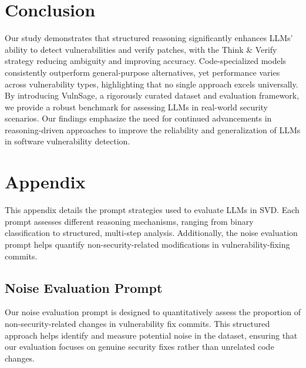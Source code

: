 \documentclass[sigconf]{acmart}
\begin{document}
\section{Conclusion}
\label{section:conclusion}
Our study demonstrates that structured reasoning significantly enhances LLMs' ability to detect vulnerabilities and verify patches, with the Think \& Verify strategy reducing ambiguity and improving accuracy. Code-specialized models consistently outperform general-purpose alternatives, yet performance varies across vulnerability types, highlighting that no single approach excels universally. By introducing VulnSage, a rigorously curated dataset and evaluation framework, we provide a robust benchmark for assessing LLMs in real-world security scenarios. Our findings emphasize the need for continued advancements in reasoning-driven approaches to improve the reliability and generalization of LLMs in software vulnerability detection.







\clearpage
\twocolumn
\flushbottom
\section{Appendix}
\label{appendix}

This appendix details the prompt strategies used to evaluate LLMs in SVD. Each prompt assesses different reasoning mechanisms, ranging from binary classification to structured, multi-step analysis. Additionally, the noise evaluation prompt helps quantify non-security-related modifications in vulnerability-fixing commits.

\subsection{Noise Evaluation Prompt}
Our noise evaluation prompt is designed to quantitatively assess the proportion of non-security-related changes in vulnerability fix commits. This structured approach helps identify and measure potential noise in the dataset, ensuring that our evaluation focuses on genuine security fixes rather than unrelated code changes.
\end{document}
